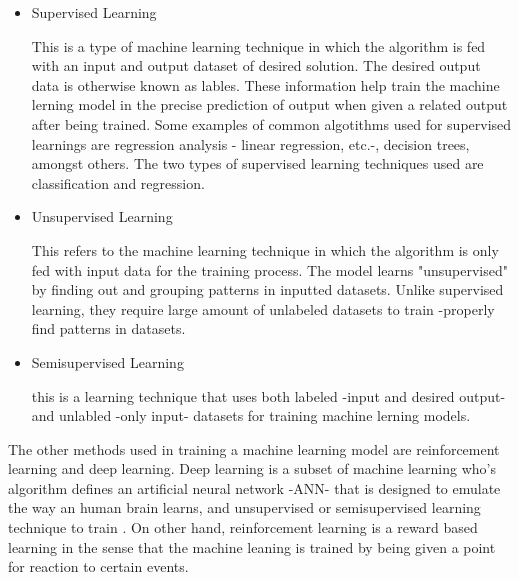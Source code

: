 \documentclass[conference]{IEEEtran}
\begin{document}
	\begin{itemize}
		\item Supervised Learning
		
		This is a type of machine learning technique in which the algorithm is fed with an input and output dataset of desired solution. The desired output data is otherwise known as lables. These information help train the machine lerning model in the precise prediction of output when given a related output after being trained. Some examples of common algotithms used for supervised learnings are regression analysis - linear regression, etc.-, decision trees, amongst others.\cite{theobald2017machine} The two types of supervised learning techniques used are classification and regression.
		\item Unsupervised Learning
		
		This refers to the machine learning technique in which the algorithm is only fed with input data for the training process. The model learns "unsupervised" by finding out and grouping patterns in inputted datasets. Unlike supervised learning, they require large amount of unlabeled datasets to train -properly find patterns in datasets.
		\item Semisupervised Learning
		
		this is a learning technique that uses both labeled -input and desired output- and unlabled -only input- datasets for training machine lerning models.
	\end{itemize}
The other methods used in training a machine learning model are reinforcement learning and deep learning. Deep learning is a subset of machine learning who's algorithm defines an artificial neural network -ANN- that is designed to emulate the way an human brain learns, and unsupervised or semisupervised learning technique to train \cite{ibm_cloud_education_2020}. On other hand, reinforcement learning is a reward based learning in the sense that the machine leaning is trained by being given a point for reaction to certain events.
\end{document}
